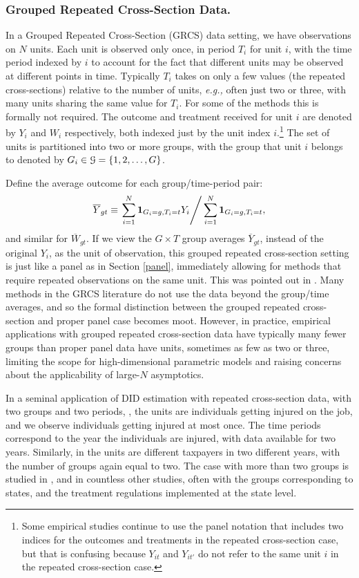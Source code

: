 \documentclass[letterpaper,12pt,leqno]{article}
\begin{document}
\subsubsection{Grouped Repeated Cross-Section Data.}\label{grcs}

In a Grouped Repeated Cross-Section (GRCS) data setting, we have observations on $N$ units. Each unit is observed only once, in period $T_i$ for unit $i$, with the time period indexed by $i$ to account for the fact that different units may be observed at different points in time. Typically $T_i$ takes on only a few values (the repeated cross-sections) relative to the number of units, {\it e.g., } often just two or three, with many units sharing the same value for $T_i$. For some of the methods this is formally not required.  The outcome and treatment received for unit $i$ are denoted by $Y_i$ and $W_i$ respectively, both indexed just by the unit index $i$.\footnote{Some empirical studies continue to use the panel notation that includes two indices for the outcomes and treatments in the repeated cross-section case, but that is confusing because $Y_{it}$ and $Y_{it'}$ do not refer to the same unit $i$ in the repeated cross-section case.} The set of units is partitioned into two or more groups, with the group that unit $i$ belongs to denoted by $G_i\in{\cal G}=\{1,2,\ldots,G\}$. 


Define the average outcome for each group/time-period pair:
\[ \overline{Y}_{gt}\equiv \left.\sum_{i=1}^N \mathbf{1}_{G_i=g,T_i=t} 
Y_i\right/ \sum_{i=1}^N \mathbf{1}_{G_i=g,T_i=t},\]
and similar for $\overline{W}_{gt}$.
If we view the $G\times T$ group averages $\overline{Y}_{gt}$, instead of the original $Y_i$, as the unit of observation, this grouped repeated cross-section setting is just like a panel as in Section \ref{panel}, immediately allowing for methods that require repeated observations on the same unit. This was  pointed out in
\cite{deaton1985panel, wooldridge2010econometric}. Many methods in the GRCS literature do not use the data beyond the group/time averages, and so the formal distinction between the grouped repeated cross-section and proper panel case becomes moot. However, in practice, empirical applications with grouped repeated cross-section data have typically many fewer groups than proper panel data have units, sometimes as few as two or three, limiting the scope for high-dimensional parametric models and raising concerns about the applicability of large-$N$ asymptotics.



In a seminal application of DID estimation with repeated cross-section data, with two groups and two periods, \citep{meyer1995workers}, the units are individuals getting injured on the job, and we observe individuals getting injured at most once. 
The time periods correspond to the  year the individuals are injured, with data available for two years. Similarly, in \citep{eissa1996labor} the units are different taxpayers in two different years, with the number of groups again equal to two.
The case with more than two groups is studied in \citep{Bertrand2004did}, and in countless other studies, often with the groups corresponding to states, and the treatment regulations implemented at the state level.
\end{document}
